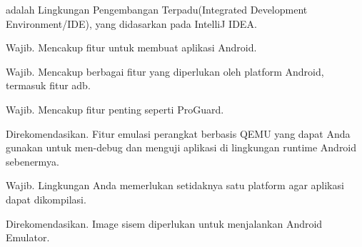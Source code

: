 adalah Lingkungan Pengembangan Terpadu(Integrated Development Environment/IDE), yang didasarkan pada IntelliJ IDEA.

Wajib. Mencakup fitur untuk membuat aplikasi Android. 

Wajib. Mencakup berbagai fitur yang diperlukan oleh platform Android, termasuk fitur adb.

Wajib. Mencakup fitur penting seperti ProGuard.

 Direkomendasikan. Fitur emulasi perangkat berbasis QEMU yang dapat Anda gunakan untuk men-debug dan menguji aplikasi di lingkungan runtime Android sebenermya.

 Wajib. Lingkungan Anda memerlukan setidaknya satu platform agar aplikasi dapat dikompilasi.

 Direkomendasikan. Image sisem diperlukan untuk menjalankan Android Emulator.